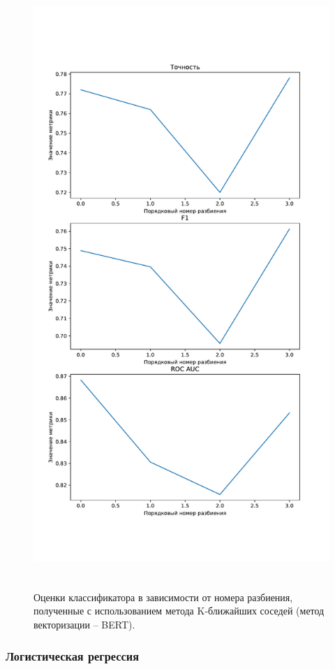 \begin{figure}[H]
	\centering
	\includegraphics[height=23cm]{inc/plots/knnMetricsBert.pdf}
	\caption{ Оценки классификатора в зависимости от номера разбиения, полученные с использованием метода K-ближайших соседей (метод векторизации -- BERT). }
	\label{img:knnMetricsBert}
\end{figure}



\subsubsection{Логистическая регрессия}

